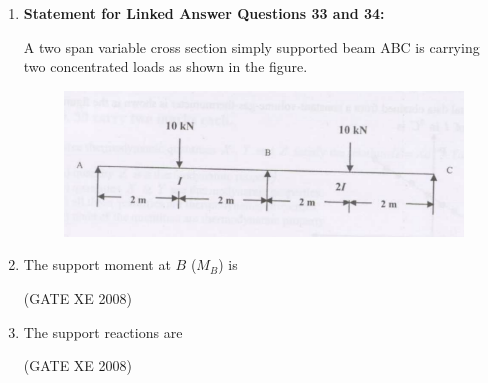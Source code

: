 \documentclass[12pt]{article}
\begin{document}
\begin{enumerate}
(GATE XE 2008)

\item[] \textbf{Statement for Linked Answer Questions 33 and 34:}  

A two span variable cross section simply supported beam ABC is carrying two concentrated loads as shown in the figure.

    \begin{figure}[H]
    \centering
    \includegraphics[width=0.7\columnwidth]{figs/ass1_f_q33.png}
    \caption{}
    \end{figure}

\item The support moment at $B$ ($M_B$) is  

\begin{enumerate}
\end{enumerate}

(GATE XE 2008)


\item The support reactions are  

\begin{enumerate}
\end{enumerate}

(GATE XE 2008)


\end{enumerate}
\end{document}
